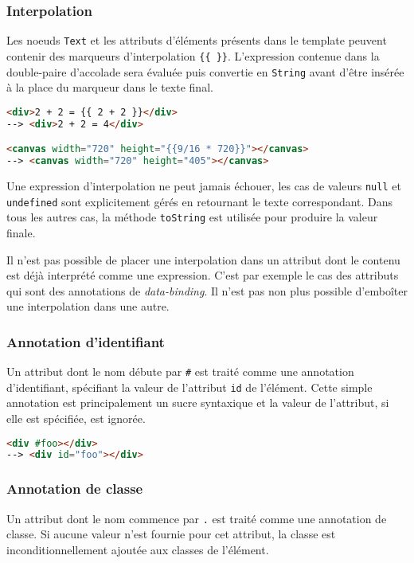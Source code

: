 \subsubsection{Interpolation}
Les noeuds \texttt{Text} et les attributs d'éléments présents dans le template peuvent contenir des marqueurs d'interpolation \texttt{\{\{ \}\}}. L'expression contenue dans la double-paire d'accolade sera évaluée puis convertie en \texttt{String} avant d'être insérée à la place du marqueur dans le texte final.

\begin{lstlisting}[language=HTML]
<div>2 + 2 = {{ 2 + 2 }}</div>
--> <div>2 + 2 = 4</div>

<canvas width="720" height="{{9/16 * 720}}"></canvas>
--> <canvas width="720" height="405"></canvas>
\end{lstlisting}

Une expression d'interpolation ne peut jamais échouer, les cas de valeurs \texttt{null} et \texttt{undefined} sont explicitement gérés en retournant le texte correspondant. Dans tous les autres cas, la méthode \texttt{toString} est utilisée pour produire la valeur finale.

Il n'est pas possible de placer une interpolation dans un attribut dont le contenu est déjà interprété comme une expression. C'est par exemple le cas des attributs qui sont des annotations de \emph{data-binding}. Il n'est pas non plus possible d'emboîter une interpolation dans une autre.

\subsubsection{Annotation d'identifiant}
Un attribut dont le nom débute par \texttt{\#} est traité comme une annotation d'identifiant, spécifiant la valeur de l'attribut \texttt{id} de l'élément. Cette simple annotation est principalement un sucre syntaxique et la valeur de l'attribut, si elle est spécifiée, est ignorée.

\begin{lstlisting}[language=HTML]
<div #foo></div>
--> <div id="foo"></div>
\end{lstlisting}

\subsubsection{Annotation de classe}
Un attribut dont le nom commence par \texttt{.} est traité comme une annotation de classe. Si aucune valeur n'est fournie pour cet attribut, la classe est inconditionnellement ajoutée aux classes de l'élément.

